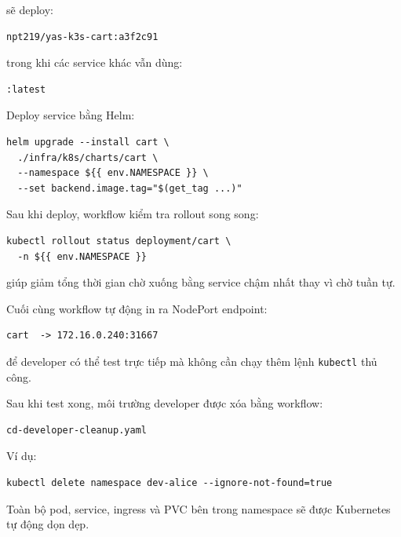 sẽ deploy:

\begin{verbatim}
npt219/yas-k3s-cart:a3f2c91
\end{verbatim}

trong khi các service khác vẫn dùng:

\begin{verbatim}
:latest
\end{verbatim}

\vspace{0.5em}

Deploy service bằng Helm:

\begin{verbatim}
helm upgrade --install cart \
  ./infra/k8s/charts/cart \
  --namespace ${{ env.NAMESPACE }} \
  --set backend.image.tag="$(get_tag ...)"
\end{verbatim}

Sau khi deploy, workflow kiểm tra rollout song song:

\begin{verbatim}
kubectl rollout status deployment/cart \
  -n ${{ env.NAMESPACE }}
\end{verbatim}

giúp giảm tổng thời gian chờ xuống bằng service chậm nhất thay vì chờ tuần tự.

\vspace{0.5em}

Cuối cùng workflow tự động in ra NodePort endpoint:

\begin{verbatim}
cart  -> 172.16.0.240:31667
\end{verbatim}

để developer có thể test trực tiếp mà không cần chạy thêm lệnh \texttt{kubectl} thủ công.

\vspace{0.5em}

Sau khi test xong, môi trường developer được xóa bằng workflow:

\begin{verbatim}
cd-developer-cleanup.yaml
\end{verbatim}

Ví dụ:

\begin{verbatim}
kubectl delete namespace dev-alice --ignore-not-found=true
\end{verbatim}

Toàn bộ pod, service, ingress và PVC bên trong namespace sẽ được Kubernetes tự động dọn dẹp.

